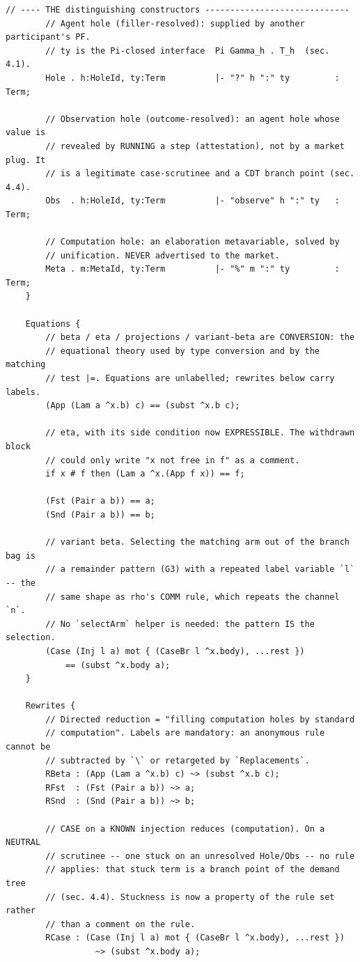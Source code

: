 \documentclass[11pt]{article}
\begin{document}
\begin{lstlisting}[language=mettail]
        // ---- THE distinguishing constructors -----------------------------
        // Agent hole (filler-resolved): supplied by another participant's PF.
        // ty is the Pi-closed interface  Pi Gamma_h . T_h  (sec. 4.1).
        Hole . h:HoleId, ty:Term          |- "?" h ":" ty         : Term;

        // Observation hole (outcome-resolved): an agent hole whose value is
        // revealed by RUNNING a step (attestation), not by a market plug. It
        // is a legitimate case-scrutinee and a CDT branch point (sec. 4.4).
        Obs  . h:HoleId, ty:Term          |- "observe" h ":" ty   : Term;

        // Computation hole: an elaboration metavariable, solved by
        // unification. NEVER advertised to the market.
        Meta . m:MetaId, ty:Term          |- "%" m ":" ty         : Term;
    }

    Equations {
        // beta / eta / projections / variant-beta are CONVERSION: the
        // equational theory used by type conversion and by the matching
        // test |=. Equations are unlabelled; rewrites below carry labels.
        (App (Lam a ^x.b) c) == (subst ^x.b c);

        // eta, with its side condition now EXPRESSIBLE. The withdrawn block
        // could only write "x not free in f" as a comment.
        if x # f then (Lam a ^x.(App f x)) == f;

        (Fst (Pair a b)) == a;
        (Snd (Pair a b)) == b;

        // variant beta. Selecting the matching arm out of the branch bag is
        // a remainder pattern (G3) with a repeated label variable `l` -- the
        // same shape as rho's COMM rule, which repeats the channel `n`.
        // No `selectArm` helper is needed: the pattern IS the selection.
        (Case (Inj l a) mot { (CaseBr l ^x.body), ...rest })
            == (subst ^x.body a);
    }

    Rewrites {
        // Directed reduction = "filling computation holes by standard
        // computation". Labels are mandatory: an anonymous rule cannot be
        // subtracted by `\` or retargeted by `Replacements`.
        RBeta : (App (Lam a ^x.b) c) ~> (subst ^x.b c);
        RFst  : (Fst (Pair a b)) ~> a;
        RSnd  : (Snd (Pair a b)) ~> b;

        // CASE on a KNOWN injection reduces (computation). On a NEUTRAL
        // scrutinee -- one stuck on an unresolved Hole/Obs -- no rule
        // applies: that stuck term is a branch point of the demand tree
        // (sec. 4.4). Stuckness is now a property of the rule set rather
        // than a comment on the rule.
        RCase : (Case (Inj l a) mot { (CaseBr l ^x.body), ...rest })
                  ~> (subst ^x.body a);


\end{lstlisting}
\end{document}
